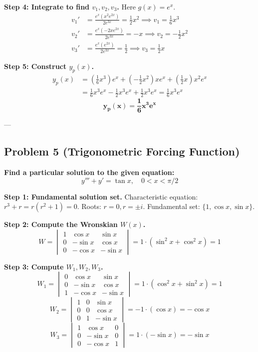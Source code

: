 \documentclass[12pt]{article}
\begin{document}
\textbf{Step 4: Integrate to find $v_1, v_2, v_3$.}
Here $g(x) = e^x$.
\begin{align*}
v_1' &= \frac{e^x (x^2 e^{2x})}{2e^{3x}} = \frac{1}{2}x^2 \implies v_1 = \frac{1}{6}x^3 \\
v_2' &= \frac{e^x (-2x e^{2x})}{2e^{3x}} = -x \implies v_2 = -\frac{1}{2}x^2 \\
v_3' &= \frac{e^x (e^{2x})}{2e^{3x}} = \frac{1}{2} \implies v_3 = \frac{1}{2}x
\end{align*}

\textbf{Step 5: Construct $y_p(x)$.}
\begin{align*}
y_p(x) &= \left(\frac{1}{6}x^3\right)e^x + \left(-\frac{1}{2}x^2\right)x e^x + \left(\frac{1}{2}x\right)x^2 e^x \\
&= \frac{1}{6}x^3 e^x - \frac{1}{2}x^3 e^x + \frac{1}{2}x^3 e^x = \frac{1}{6}x^3 e^x
\end{align*}
\[ \mathbf{y_p(x) = \frac{1}{6}x^3 e^x} \]

---

\subsection{Problem 5 (Trigonometric Forcing Function)}
\textbf{Find a particular solution to the given equation:}
\[ y''' + y' = \tan x, \quad 0 < x < \pi/2 \]

\textbf{Step 1: Fundamental solution set.}
Characteristic equation: $r^3 + r = r(r^2 + 1) = 0$. Roots: $r=0, r=\pm i$.
Fundamental set: $\{1, \cos x, \sin x\}$.

\textbf{Step 2: Compute the Wronskian $W(x)$.}
\[ W = \begin{vmatrix} 1 & \cos x & \sin x \\ 0 & -\sin x & \cos x \\ 0 & -\cos x & -\sin x \end{vmatrix} = 1 \cdot (\sin^2 x + \cos^2 x) = 1 \]

\textbf{Step 3: Compute $W_1, W_2, W_3$.}
\[ W_1 = \begin{vmatrix} 0 & \cos x & \sin x \\ 0 & -\sin x & \cos x \\ 1 & -\cos x & -\sin x \end{vmatrix} = 1 \cdot (\cos^2 x + \sin^2 x) = 1 \]
\[ W_2 = \begin{vmatrix} 1 & 0 & \sin x \\ 0 & 0 & \cos x \\ 0 & 1 & -\sin x \end{vmatrix} = -1 \cdot (\cos x) = -\cos x \]
\[ W_3 = \begin{vmatrix} 1 & \cos x & 0 \\ 0 & -\sin x & 0 \\ 0 & -\cos x & 1 \end{vmatrix} = 1 \cdot (-\sin x) = -\sin x \]
\end{document}
